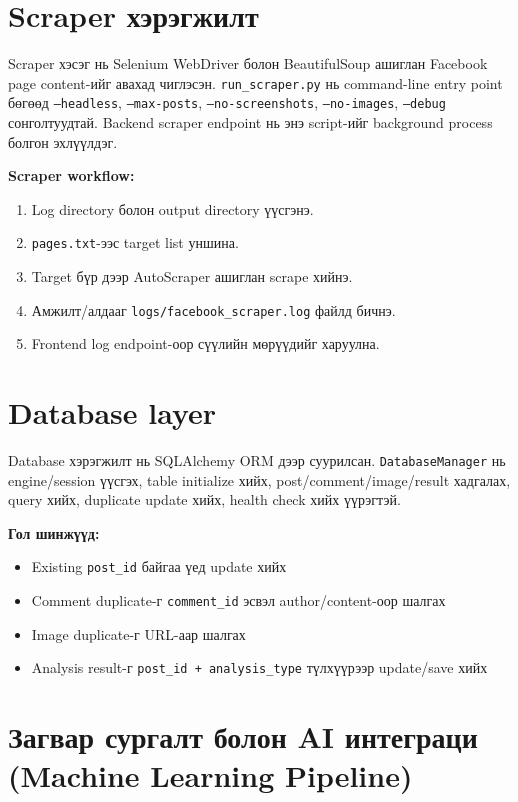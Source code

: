 \documentclass[
12pt,
oneside,
english,
onehalfspacing,
nolistspacing,
headsepline,
]{MUST-Thesis}
\begin{document}
\section{Scraper хэрэгжилт}

Scraper хэсэг нь Selenium WebDriver болон BeautifulSoup ашиглан Facebook page content-ийг авахад чиглэсэн. \texttt{run\_scraper.py} нь command-line entry point бөгөөд \texttt{--headless}, \texttt{--max-posts}, \texttt{--no-screenshots}, \texttt{--no-images}, \texttt{--debug} сонголтуудтай. Backend scraper endpoint нь энэ script-ийг background process болгон эхлүүлдэг.

\textbf{Scraper workflow:}
\begin{enumerate}
    \item Log directory болон output directory үүсгэнэ.
    \item \texttt{pages.txt}-ээс target list уншина.
    \item Target бүр дээр AutoScraper ашиглан scrape хийнэ.
    \item Амжилт/алдааг \texttt{logs/facebook\_scraper.log} файлд бичнэ.
    \item Frontend log endpoint-оор сүүлийн мөрүүдийг харуулна.
\end{enumerate}

\section{Database layer}

Database хэрэгжилт нь SQLAlchemy ORM дээр суурилсан. \texttt{DatabaseManager} нь engine/session үүсгэх, table initialize хийх, post/comment/image/result хадгалах, query хийх, duplicate update хийх, health check хийх үүрэгтэй.

\textbf{Гол шинжүүд:}
\begin{itemize}
    \item Existing \texttt{post\_id} байгаа үед update хийх
    \item Comment duplicate-г \texttt{comment\_id} эсвэл author/content-оор шалгах
    \item Image duplicate-г URL-аар шалгах
    \item Analysis result-г \texttt{post\_id + analysis\_type} түлхүүрээр update/save хийх
\end{itemize}

\section{Загвар сургалт болон AI интеграци (Machine Learning Pipeline)}
\end{document}
